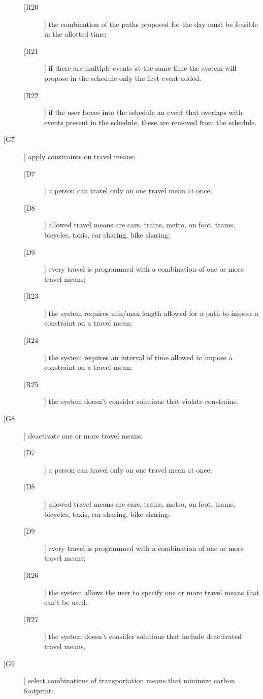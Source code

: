 \begin{description}
\begin{description}
	\newline
	\item[[R20]] the combination of the paths proposed for the day must be feasible in the allotted time;
	\item[[R21]] if there are multiple events at the same time the system will propose in the schedule only the first event added.
	\item[[R22]] if the user forces into the schedule an event that overlaps with events present in the schedule, these are removed from the schedule.
	\end{description}
\item[[G7]] apply constraints on travel means:
	\begin{description}
	\item[[D7]] a person can travel only on one travel mean at once; 
	\item[[D8]] allowed travel means are cars, trains, metro, on foot, trams, bicycles, taxis, car sharing, bike sharing;	
	\item[[D9]] every travel is programmed with a combination of one or more travel means;
	\newline
	\item[[R23]] the system requires min/max length allowed for a path to impose a constraint on a travel mean;
	\item[[R24]] the system requires an interval of time allowed to impose a constraint on a travel mean;
	\item[[R25]] the system doesn’t consider solutions that violate constrains.
	\end{description}
\item[[G8]] deactivate one or more travel means:
	\begin{description}
	\item[[D7]] a person can travel only on one travel mean at once; 
	\item[[D8]] allowed travel means are cars, trains, metro, on foot, trams, bicycles, taxis, car sharing, bike sharing;	
	\item[[D9]] every travel is programmed with a combination of one or more travel means;
	\newline
	\item[[R26]] the system allows the user to specify one or more travel means that can’t be used.
	\item[[R27]] the system doesn’t consider solutions that include deactivated travel means.
	\end{description}
\item[[G9]] select combinations of transportation means that minimize carbon footprint:

\end{description}
